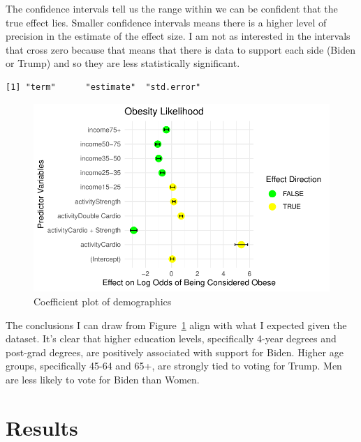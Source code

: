 \documentclass[
  letterpaper,
  DIV=11,
  numbers=noendperiod]{scrartcl}
\begin{document}
The confidence intervals tell us the range within we can be confident
that the true effect lies. Smaller confidence intervals means there is a
higher level of precision in the estimate of the effect size. I am not
as interested in the intervals that cross zero because that means that
there is data to support each side (Biden or Trump) and so they are less
statistically significant.

\begin{verbatim}
[1] "term"      "estimate"  "std.error"
\end{verbatim}

\begin{figure}

{\centering \includegraphics{paper_files/figure-pdf/fig-coefficient-1.pdf}

}

\caption{\label{fig-coefficient}Coefficient plot of demographics}

\end{figure}

The conclusions I can draw from Figure~\ref{fig-coefficient} align with
what I expected given the dataset. It's clear that higher education
levels, specifically 4-year degrees and post-grad degrees, are
positively associated with support for Biden. Higher age groups,
specifically 45-64 and 65+, are strongly tied to voting for Trump. Men
are less likely to vote for Biden than Women.

\newpage

\hypertarget{results}{%
\section{Results}\label{results}}
\end{document}
